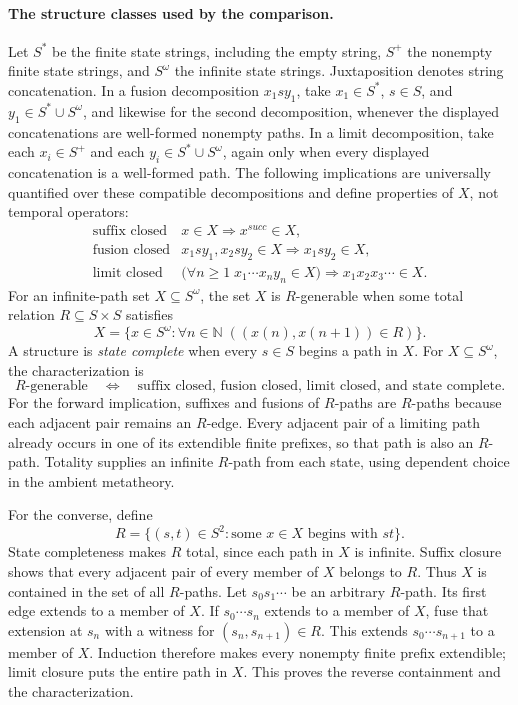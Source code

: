 \paragraph{The structure classes used by the comparison.}
Let \(S^*\) be the finite state strings, including the empty string,
\(S^+\) the nonempty finite state strings, and \(S^\omega\) the infinite state
strings.  Juxtaposition denotes string concatenation.  In a fusion
decomposition \(x_1sy_1\), take
\(x_1\in S^*\), \(s\in S\), and \(y_1\in S^*\cup S^\omega\), and likewise
for the second decomposition, whenever the displayed concatenations are
well-formed nonempty paths.  In a limit decomposition, take each
\(x_i\in S^+\) and each \(y_i\in S^*\cup S^\omega\), again only when every
displayed concatenation is a well-formed path.  The following implications are
universally quantified over these compatible decompositions and define
properties of \(X\), not temporal operators:
\[
\begin{array}{ll}
\text{suffix closed}
 &x\in X\Rightarrow x^{succ}\in X,\\[2pt]
\text{fusion closed}
 &x_1sy_1,x_2sy_2\in X\Rightarrow x_1sy_2\in X,\\[2pt]
\text{limit closed}
 &\bigl(\forall n\geq1\;x_1\cdots x_ny_n\in X\bigr)
   \Rightarrow x_1x_2x_3\cdots\in X.
\end{array}
\]
For an infinite-path set \(X\subseteq S^\omega\), the set \(X\) is
\(R\)-generable when some total relation \(R\subseteq S\times S\) satisfies
\[
 X=\{x\in S^\omega:\forall n\in\mathbb N\;((x(n),x(n+1))\in R)\}.
\]
A structure is \emph{state complete} when every \(s\in S\) begins a path
in \(X\).  For \(X\subseteq S^\omega\), the characterization is
\[
 \text{\(R\)-generable}
 \quad\Longleftrightarrow\quad
 \text{suffix closed, fusion closed, limit closed, and state complete}.
\]
For the forward implication, suffixes and fusions of \(R\)-paths are
\(R\)-paths because each adjacent pair remains an \(R\)-edge.
Every adjacent pair of a limiting path already occurs in one of its
extendible finite prefixes, so that path is also an \(R\)-path.
Totality supplies an infinite \(R\)-path from each state, using dependent
choice in the ambient metatheory.

For the converse, define
\[
 R=\{(s,t)\in S^2:\text{some }x\in X
                         \text{ begins with }st\}.
\]
State completeness makes \(R\) total, since each path in \(X\) is infinite.
Suffix closure shows that every adjacent pair of every member of \(X\)
belongs to \(R\).  Thus \(X\) is contained in the set of all \(R\)-paths.
Let \(s_0s_1\cdots\) be an arbitrary \(R\)-path.
Its first edge extends to a member of \(X\).
If \(s_0\cdots s_n\) extends to a member of \(X\), fuse that extension at
\(s_n\) with a witness for \((s_n,s_{n+1})\in R\).
This extends \(s_0\cdots s_{n+1}\) to a member of \(X\).
Induction therefore makes every nonempty finite prefix extendible;
limit closure puts the entire path in \(X\).
This proves the reverse containment and the characterization.

